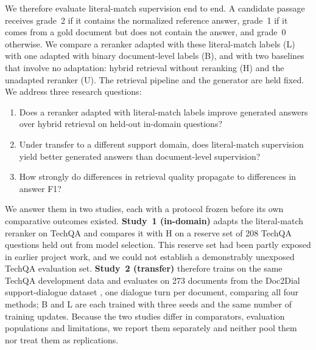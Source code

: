 We therefore evaluate literal-match supervision end to end. A candidate passage receives grade~2 if it contains the normalized reference answer, grade~1 if it comes from a gold document but does not contain the answer, and grade~0 otherwise. We compare a reranker adapted with these literal-match labels (L) with one adapted with binary document-level labels (B), and with two baselines that involve no adaptation: hybrid retrieval without reranking (H) and the unadapted reranker (U). The retrieval pipeline and the generator are held fixed. We address three research questions:
\begin{enumerate}[label=\textbf{RQ\arabic*},leftmargin=3em]
\item Does a reranker adapted with literal-match labels improve generated answers over hybrid retrieval on held-out in-domain questions?
\item Under transfer to a different support domain, does literal-match supervision yield better generated answers than document-level supervision?
\item How strongly do differences in retrieval quality propagate to differences in answer F1?
\end{enumerate}

We answer them in two studies, each with a protocol frozen before its own comparative outcomes existed. \textbf{Study~1 (in-domain)} adapts the literal-match reranker on TechQA \citep{castelli2020} and compares it with H on a reserve set of 208 TechQA questions held out from model selection. This reserve set had been partly exposed in earlier project work, and we could not establish a demonstrably unexposed TechQA evaluation set. \textbf{Study~2 (transfer)} therefore trains on the same TechQA development data and evaluates on 273 documents from the Doc2Dial support-dialogue dataset \citep{feng2020}, one dialogue turn per document, comparing all four methods; B and L are each trained with three seeds and the same number of training updates. Because the two studies differ in comparators, evaluation populations and limitations, we report them separately and neither pool them nor treat them as replications.

